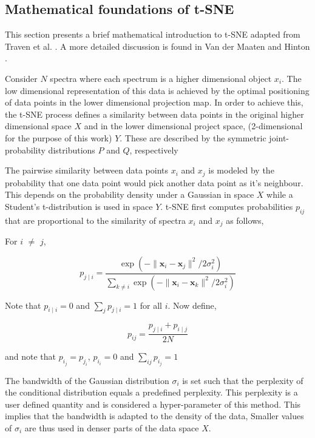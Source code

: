 \subsection{Mathematical foundations of t-SNE}

This section presents a brief mathematical introduction to t-SNE adapted from Traven et al. \cite{traven2017galah}. A more detailed discussion is found in Van der Maaten and Hinton \cite{van2008visualizing}. 

Consider $N$ spectra where each spectrum is a higher dimensional object $x_i$. The low dimensional representation of this data is achieved by the optimal positioning of data points in the lower dimensional projection map. In order to achieve this, the t-SNE process defines a similarity between data points in the original higher dimensional space $X$ and in the lower dimensional project space, (2-dimensional for the purpose of this work) $Y$. These are described by the symmetric joint-
probability distributions $P$ and $Q$, respectively

The pairwise similarity between data points $x_i$ and $x_j$ is modeled by the probability that one data point would pick another data point as it's neighbour. This depends on the probability density under a Gaussian in space $X$ while a Student's t-distribution is used in space $Y$. t-SNE first computes probabilities $p_{ij}$ that are proportional to the similarity of spectra $x_i$ and $x_j$ as follows,


For $i$ $\neq$ $j$,

\begin{equation}
p_{j\mid i}={\frac {\exp(-\lVert \mathbf {x} _{i}-\mathbf {x} _{j}\rVert ^{2}/2\sigma _{i}^{2})}{\sum _{k\neq i}\exp(-\lVert \mathbf {x} _{i}-\mathbf {x} _{k}\rVert ^{2}/2\sigma _{i}^{2})}}
\end{equation}

Note that $p_{i\mid i}=0$ and $\sum _{j}p_{j\mid i}=1$ for all $i$. Now define,

\begin{equation}
    p_{ij}={\frac {p_{j\mid i}+p_{i\mid j}}{2N}}
\end{equation}

and note that $p_i_j=p_j_i$, $p_i_i=0$ and $\sum _{ij} p_i_j=1$

The bandwidth of the Gaussian distribution $\sigma_i$ is set such that the perplexity of the conditional distribution equals a predefined perplexity. This perplexity is a user defined quantity and is considered a hyper-parameter of this method. This implies that the bandwidth is adapted to the density of the data, Smaller values of $\sigma_i$ are thus used in denser parts of the data space $X$. 

